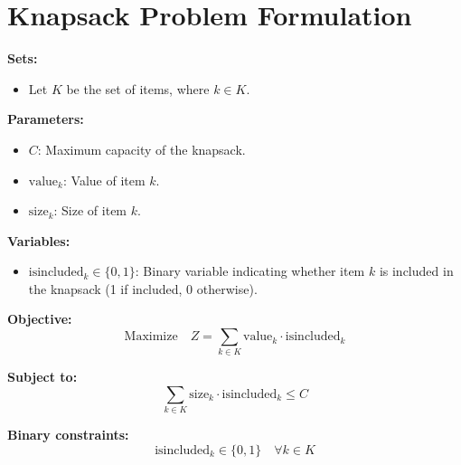 \documentclass{article}
\begin{document}
\section*{Knapsack Problem Formulation}

\textbf{Sets:}
\begin{itemize}
    \item Let \( K \) be the set of items, where \( k \in K \).
\end{itemize}

\textbf{Parameters:}
\begin{itemize}
    \item \( C \): Maximum capacity of the knapsack.
    \item \( \text{value}_{k} \): Value of item \( k \).
    \item \( \text{size}_{k} \): Size of item \( k \).
\end{itemize}

\textbf{Variables:}
\begin{itemize}
    \item \( \text{isincluded}_{k} \in \{0, 1\} \): Binary variable indicating whether item \( k \) is included in the knapsack (1 if included, 0 otherwise).
\end{itemize}

\textbf{Objective:}
\[
\text{Maximize} \quad Z = \sum_{k \in K} \text{value}_{k} \cdot \text{isincluded}_{k}
\]

\textbf{Subject to:}
\[
\sum_{k \in K} \text{size}_{k} \cdot \text{isincluded}_{k} \leq C
\]

\textbf{Binary constraints:}
\[
\text{isincluded}_{k} \in \{0, 1\} \quad \forall k \in K
\]
\end{document}
